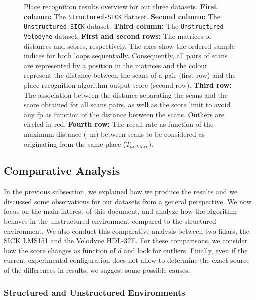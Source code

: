 \begin{figure}
    \caption[Place recognition results overview for our three datasets.]{Place recognition results overview for our three datasets. \textbf{First column:} The \texttt{Structured-SICK} dataset. \textbf{Second column:} The \texttt{Unstructured-SICK} dataset. \textbf{Third column:} The \texttt{Unstructured-Velodyne} dataset. \textbf{First and second rows:} The matrices of distances and scores, respectively. The axes show the ordered sample indices for both loops sequentially. Consequently, all pairs of scans are represented by a position in the matrices and the colour represent the distance between the scans of a pair (first row) and the place recognition algorithm output score (second row). \textbf{Third row:} The association between the distance separating the scans and the score obtained for all scans pairs, as well as the score limit to avoid any \gls*{fp} as function of the distance between the scans. Outliers are circled in red. \textbf{Fourth row:} The recall rate as function of the maximum distance (\SI{}{\meter}) between scans to be considered as originating from the same place ($T_{distance}$).} 
    \label{fig:chap_slam_results}
\end{figure}

\subsection{Comparative Analysis}
\label{ssec:chap_slam_comparative_analysis}

In the previous subsection, we explained how we produce the results and we discussed some observations for our datasets from a general perspective. We now focus on the main interest of this document, and analyze how the algorithm behaves in the unstructured environment compared to the structured environment. We also conduct this comparative analysis between two \gls*{lidar}s, the SICK LMS151 and the Velodyne HDL-32E. For these comparisons, we consider how the score changes as function of $d$ and look for outliers. Finally, even if the current experimental configuration does not allow to determine the exact source of the differences in results, we suggest some possible causes.


\subsubsection{Structured and Unstructured Environments}
\label{ssec:chap_slam_struct_vs_forest}

